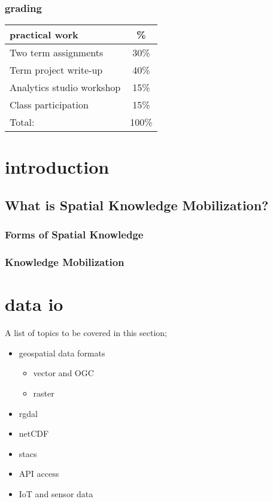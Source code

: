\documentclass[
]{book}
\providecommand{\tightlist}{%
  \setlength{\itemsep}{0pt}\setlength{\parskip}{0pt}}
\begin{document}
\hypertarget{grading}{%
\subsection{grading}\label{grading}}

\begin{longtable}[]{@{}lc@{}}
\toprule
practical work & \%\tabularnewline
\midrule
\endhead
Two term assignments & 30\%\tabularnewline
Term project write-up & 40\%\tabularnewline
Analytics studio workshop & 15\%\tabularnewline
Class participation & 15\%\tabularnewline
Total: & 100\%\tabularnewline
\bottomrule
\end{longtable}

\hypertarget{intro}{%
\chapter{introduction}\label{intro}}

\hypertarget{what-is-spatial-knowledge-mobilization}{%
\section{What is Spatial Knowledge Mobilization?}\label{what-is-spatial-knowledge-mobilization}}

\hypertarget{forms-of-spatial-knowledge}{%
\subsection{Forms of Spatial Knowledge}\label{forms-of-spatial-knowledge}}

\hypertarget{knowledge-mobilization}{%
\subsection{Knowledge Mobilization}\label{knowledge-mobilization}}

\hypertarget{data-io}{%
\chapter{data io}\label{data-io}}

A list of topics to be covered in this section;

\begin{itemize}
\tightlist
\item
  geospatial data formats

  \begin{itemize}
  \tightlist
  \item
    vector and OGC
  \item
    raster
  \end{itemize}
\item
  rgdal
\item
  netCDF
\item
  stacs
\item
  API access
\item
  IoT and sensor data
\end{itemize}
\end{document}
